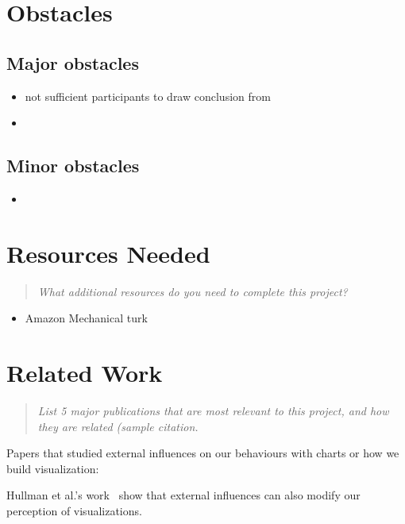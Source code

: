 \documentclass{proc}
\begin{document}
\section{Obstacles}

\subsection{Major obstacles} %
\begin{itemize}
    \item not sufficient participants to draw conclusion from
    \item 
\end{itemize}
\subsection{Minor obstacles}
\begin{itemize}
    \item  
\end{itemize}

\section{Resources Needed}
\begin{quote}
\textit{What additional resources do you need to complete this project?}
\end{quote}
\begin{itemize}
    \item Amazon Mechanical turk 
\end{itemize}

\section{Related Work}
\begin{quote}
\textit{List 5 major publications that are most relevant to this project, and how they are related (sample citation.}
\end{quote}

Papers that studied external influences on our behaviours with charts or how we build visualization:

Hullman et al.'s work~\cite{hullman2011impact} show that external influences can also modify our perception of visualizations.
\end{document}
